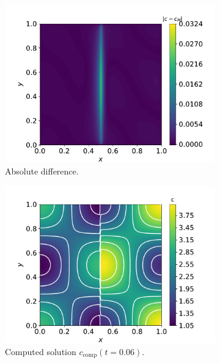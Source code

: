 \begin{figure}
\begin{subfigure}{0.33\linewidth}
        \centering
        \includegraphics[width=\linewidth]{Figures/Chapter3/monoblocks/interface_condition/diff_t0.01.pdf}
        \caption{Absolute difference.}
    \end{subfigure}
    \begin{subfigure}{0.33\linewidth}
        \centering
        \includegraphics[width=\linewidth]{Figures/Chapter3/monoblocks/interface_condition/u_computed_t0.06.pdf}
        \caption{Computed solution $c_\mathrm{comp}(t=0.06)$.}
    \end{subfigure}%
    \begin{subfigure}{0.33\linewidth}
        \centering

\end{subfigure}
\end{figure}
